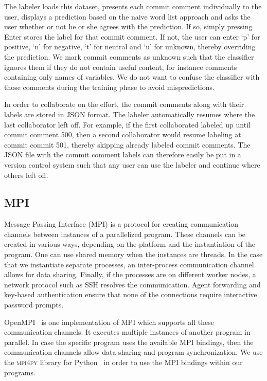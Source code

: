 \documentclass{article}
\begin{document}
The labeler loads this dataset, presents each commit comment individually to
the user, displays a prediction based on the naive word list approach and asks
the user whether or not he or she agrees with the prediction. If so, simply
pressing Enter stores the label for that commit comment. If not, the user
can enter `p' for positive, `n' for negative, `t' for neutral and `u' for
unknown, thereby overriding the prediction. We mark commit comments as unknown
such that the classifier ignores them if they do not contain useful content,
for instance comments containing only names of variables. We do not want to
confuse the classifier with those comments during the training phase to avoid
mispredictions.

In order to collaborate on the effort, the commit comments along with their
labels are stored in JSON format. The labeler automatically resumes where
the last collaborator left off. For example, if the first collaborated labeled
up until commit comment 500, then a second collaborator would resume labeling
at commit commit 501, thereby skipping already labeled commit comments. The
JSON file with the commit comment labels can therefore easily be put in a
version control system such that any user can use the labeler and continue 
where others left off.

\subsection{MPI}\label{sec:mpi}
Message Passing Interface (MPI) is a protocol for creating communication 
channels between instances of a parallelized program. These channels can be 
created in various ways, depending on the platform and the instantiation of the 
program. One can use shared memory when the instances are threads. In the case 
that we instantiate separate processes, an inter-process communication channel 
allows for data sharing. Finally, if the processes are on different worker 
nodes, a network protocol such as SSH resolves the communication. Agent 
forwarding and key-based authentication ensure that none of the connections 
require interactive password prompts.

OpenMPI~\cite{gabriel2004openmpi} is one implementation of MPI which supports 
all these communication channels. It executes multiple instances of another
program in parallel. In case the specific program uses the available MPI
bindings, then the communication channels allow data sharing and program
synchronization. We use the \textsc{mpi4py} library for
Python~\cite{dalcin2008mpi4py} in order to use the MPI bindings within our 
programs.
\end{document}

